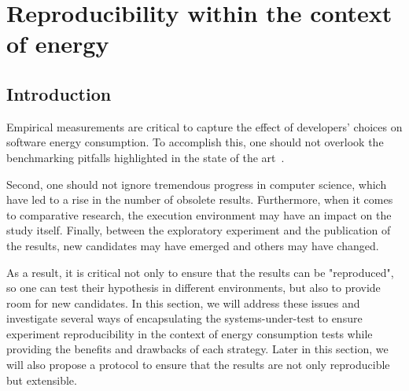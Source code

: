 \section{Reproducibility within the context of energy}\label{sec:benchmarking_reproducibility}
\subsection{Introduction}

Empirical measurements are critical to capture the effect of developers' choices on software energy consumption.
To accomplish this, one should not overlook the benchmarking pitfalls highlighted in the state of the art~\cite{van_der_kouwe_benchmarking_2018}.

Second, one should not ignore tremendous progress in computer science, which have led to a rise in the number of obsolete results.
Furthermore, when it comes to comparative research, the execution environment may have an impact on the study itself.
Finally, between the exploratory experiment and the publication of the results, new candidates may have emerged and others may have changed.

As a result, it is critical not only to ensure that the results can be "reproduced", so one can test their hypothesis in different environments, but also to provide room for new candidates.
In this section, we will address these issues and investigate several ways of encapsulating the systems-under-test to ensure experiment reproducibility in the context of energy consumption tests while providing the benefits and drawbacks of each strategy.
Later in this section, we will also propose a protocol to ensure that the results are not only reproducible but extensible.








